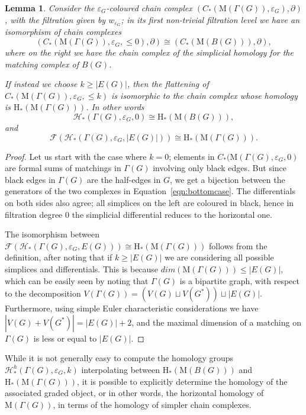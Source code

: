 \documentclass[11pt, a4paper, reqno, twoside, makeidx]{amsart}
\theoremstyle{remark}
\theoremstyle{plain}
\newtheorem{lem}[thm]{Lemma}
\theoremstyle{definition}
\newcommand{\HH}{\mathrm{H}}
\newcommand{\Mat}{\mathrm{M}}
\begin{document}
\begin{lem}\label{lem:filtrationtait}
Consider the $\varepsilon_G$-coloured chain complex $\left( C_*(\Mat (\Gamma(G)), \varepsilon_G), \partial \right)$, with the filtration given by $w_{\varepsilon_G}$; in its first non-trivial filtration level we have an isomorphism of chain complexes 
\begin{equation}\label{eqn:bottomcase}
\left( C_*(\Mat (\Gamma(G)),\varepsilon_G, \le0), \partial \right) \cong \left(  C_*(\Mat (B(G))), \partial \right),
\end{equation}
where on the right we have the chain complex of the simplicial homology for the matching complex of $B(G)$.

If instead we choose $k \ge |E(G)|$, then the flattening of $C_*(\Mat (\Gamma(G)), \varepsilon_G, \le k)$ is isomorphic to the chain complex whose homology is  $ \HH_*(\Mat (\Gamma(G)))$. 
In other words $$\mathcal{H}_*(\Gamma(G),\varepsilon_G, 0) \cong \HH_*(\Mat (B(G))),$$ and $$\mathcal{F}\left( \mathcal{H}_*(\Gamma(G),\varepsilon_G, |E(G)|) \right) \cong \HH_*(\Mat (\Gamma(G))).$$
\end{lem}
\begin{proof}

Let us start with the case where $k = 0$; elements in $C_*(\Mat (\Gamma(G),\varepsilon_G, 0)$ are formal sums of matchings in $\Gamma(G)$ involving only black edges. But since black edges in $\Gamma(G)$ are the half-edges in $G$, we get a bijection between the generators of the two complexes in Equation~\eqref{eqn:bottomcase}. The differentials on both sides also agree;  all simplices on the left are coloured in black, hence in filtration degree $0$ the simplicial differential reduces to the horizontal one. 

The isomorphism between $\mathcal{F}\left(\mathcal{H}_*(\Gamma(G),\varepsilon_G, E(G))\right) \cong \HH_*(\Mat (\Gamma(G)))$ follows from the definition, after noting that if $k \ge |E(G)|$ we are considering all possible simplices and differentials. This is because $dim(\Mat(\Gamma(G))) \le |E(G)|$, which can be easily seen by noting that $\Gamma(G)$ is a bipartite graph, with respect to the decomposition   $V(\Gamma(G)) = (V(G) \sqcup V(G^*)) \sqcup |E(G)|$.  Furthermore, using simple Euler characteristic considerations we have $|V(G) + V(G^*)| = |E(G)|+2$, and the maximal dimension of a matching on $\Gamma(G)$ is less or equal to $|E(G)|$.
\end{proof}

While it is not generally easy to compute the homology groups $\mathcal{H}^h_* (\Gamma(G), \varepsilon_G, k)$ interpolating between $\HH_*(\Mat (B(G)))$ and $\HH_*(\Mat (\Gamma(G)))$, it is possible to explicitly determine the homology of the associated graded object, or in other words, the horizontal homology of $\Mat (\Gamma(G))$, in terms of the homology of simpler chain complexes.
\end{document}
